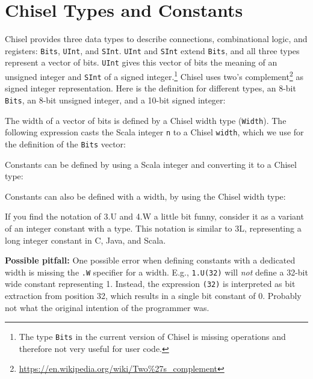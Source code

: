 \documentclass[%
    10pt,
    headinclude, footexclude,
    openright, %
    notitlepage,
    cleardoubleempty,
    headsepline,
    pointlessnumbers,
    bibtotoc, idxtotoc,
    ]{scrbook}
\newcommand{\code}[1]{{\small{\texttt{#1}}}}
\newcommand{\codefoot}[1]{{\footnotesize{\texttt{#1}}}}
\newcommand{\myref}[2]{\href{#1}{#2}}
\renewcommand{\myref}[2]{{#2}{\footnote{\url{#1}}}}
\begin{document}
\section{Chisel Types and Constants}

Chisel provides three data types to describe connections, combinational logic, and registers:
\code{Bits}, \code{UInt}, and \code{SInt}. \code{UInt} and \code{SInt} extend \code{Bits},
and all three types represent a vector of bits. \code{UInt} gives this vector of
bits the meaning of an unsigned integer and \code{SInt} of a signed
integer.\footnote{The type \codefoot{Bits} in the current version of Chisel is missing operations and
therefore not very useful for user code.}
Chisel uses \myref{https://en.wikipedia.org/wiki/Two\%27s\_complement}{two's complement}
as signed integer representation.
Here is the definition for different types, an 8-bit \code{Bits}, an 8-bit unsigned integer, and a 10-bit
signed integer:


\noindent The width of a vector of bits is defined by a Chisel width type (\code{Width}).
The following expression casts the Scala integer \code{n} to a Chisel \code{width},
which we use for the definition of the \code{Bits} vector:




\noindent Constants can be defined by using a Scala integer and converting it to a Chisel type:


\noindent Constants can also be defined with a width, by using the Chisel width type:


\noindent If you find the notation of 3.U and 4.W a little bit funny, consider it as a variant of an integer
constant with a type. This notation is similar to 3L, representing a long integer constant in C, Java, and Scala.

{\bf Possible pitfall:} One possible error when defining constants with a dedicated width is missing the \code{.W}
specifier for a width. E.g., \code{1.U(32)} will \emph{not} define a 32-bit wide constant representing 1.
Instead, the expression \code{(32)} is interpreted as bit extraction from position 32, which results
in a single bit constant of 0. Probably not what the original intention of the programmer was.
\end{document}
